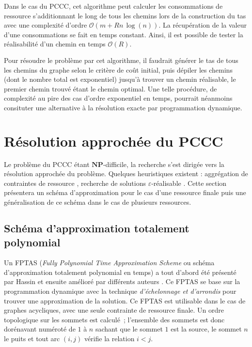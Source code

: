 \documentclass[10pt,francais]{llncs}
\begin{document}
Dans le cas du PCCC, cet algorithme peut calculer les consommations de ressource s'additionnant le long de tous les chemins lors de la construction du tas avec une complexit\'e d'ordre $\mathcal{O}(m + Rn\, \log(n))$. La r\'ecup\'eration de la valeur d'une consommations se fait en temps constant. Ainsi, il est possible de tester la r\'ealisabilit\'e d'un chemin en temps $\mathcal{O}(R)$. 

Pour r\'esoudre le probl\`eme par cet algorithme, il faudrait g\'en\'erer le tas de tous les chemins du graphe selon le crit\`ere de co\^ut initial, puis d\'epiler les chemins (dont le nombre total est exponentiel) jusqu'\`a trouver un chemin r\'ealisable, le premier chemin trouv\'e \'etant le chemin optimal. Une telle proc\'edure, de complexit\'e au pire des cas d'ordre exponentiel en temps, pourrait n\'eanmoins consituter une alternative \`a la r\'esolution exacte par programmation dynamique.



\section{R\'esolution approch\'ee du PCCC}\label{sec-approx}

Le probl\`eme du PCCC \'etant $\mathbf{NP}$-difficile, la recherche s'est dirig\'ee vers la r\'esolution approch\'ee du probl\`eme. Quelques heuristiques existent : aggr\'egation de contraintes de ressource \cite{Nagih2005}, recherche de solutions $\varepsilon$-r\'ealisable \cite{Avella2002}. Cette section pr\'esentera un sch\'ema d'approximation pour le cas d'une ressource finale puis une g\'en\'eralisation de ce sch\'ema dans le cas de plusieurs ressources.

\subsection{Sch\'ema d'approximation totalement polynomial}\label{sub-approx-fptas}
Un FPTAS ({\em Fully Polynomial Time Approximation Scheme} ou sch\'ema d'approximation totalement polynomial en temps) a tout d'abord \'et\'e pr\'esent\'e par Hassin \cite{Hassin1992} et ensuite am\'elior\'e par diff\'erents auteurs \cite{Phillips1993,Lorenz2001,Ergun2002}. Ce FPTAS se base sur la programmation dynamique avec la technique {\em d'\'echelonnage et d'arrondis} pour trouver une approximation de la solution. Ce FPTAS est utilisable dans le cas de graphes acycliques, avec une seule contrainte de ressource finale. Un ordre topologique sur les sommets est calcul\'e~; l'ensemble des sommets est donc dor\'enavant num\'erot\'e de $1$ \`a $n$ sachant que le sommet $1$ est la source, le sommet $n$ le puits et tout arc $(i,j)$ v\'erifie la relation $i<j$.
\end{document}
